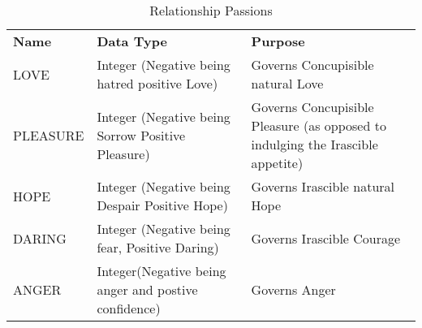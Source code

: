 \documentclass[10pt]{article}
\begin{document}
\begin{longtable}{| p{6cm} | p{3cm} | p{10cm} |}
\caption{Relationship Passions}
\label{tab:RelationshipPassions}\\
\hline 
\textbf{Name} & \textbf{Data Type} & \textbf{Purpose} \\
LOVE & Integer (Negative being hatred positive Love) & Governs Concupisible natural Love \\
\hline
PLEASURE & Integer (Negative being Sorrow Positive Pleasure) & Governs Concupisible Pleasure (as opposed to indulging the Irascible appetite) \\
\hline
HOPE & Integer (Negative being Despair Positive Hope) & Governs Irascible natural Hope \\
\hline
DARING & Integer (Negative being fear, Positive Daring) & Governs Irascible Courage \\
\hline
ANGER & Integer(Negative being anger and postive confidence) & Governs Anger\\
\hline


\end{longtable}
\end{document}
